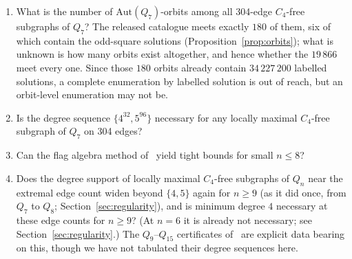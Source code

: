 \documentclass[12pt]{article}
\newcommand{\ex}{\mathrm{ex}}
\begin{document}
\begin{enumerate}
    non-odd-square construction exceed $g(8)=682$? The $Q_7$ audit of
    Section~\ref{sec:oddsquareaudit} shows the two questions are genuinely
    different for $n=7$ (the released $304$-edge solutions are
    overwhelmingly non-odd-square), so no assumption is made
    here about which way $n=8$ resolves. Our current understanding of the
    structural side, stated as such: the parity obstruction of
    Proposition~\ref{prop:q6realizability} operates \emph{inside} the
    odd-square class -- it constrains which field histograms a fully
    frustrated spin configuration can realise -- and says nothing about
    non-odd-square subgraphs; we know of no structural obstruction to a
    non-odd-square $C_4$-free subgraph exceeding $g(n)$. What the data show
    is only this: at $n=6$, where $\ex$ is known, nothing exceeds $g(6)$;
    at $n=7$ every known $304$-edge solution matches $g(7)$ while $98\%$
    of them lie outside the subclass. We read the latter as weak evidence
    that the odd-square constraint is not what pins the known extremal
    count, not as evidence about whether $g(8)$ can be exceeded.
  \item\label{op:orbits} What is the number of $\mathrm{Aut}(Q_7)$-orbits among all 304-edge
    $C_4$-free subgraphs of $Q_7$? The released catalogue meets exactly
    $180$ of them, six of which contain the odd-square solutions
    (Proposition~\ref{prop:orbits}); what is unknown is how many orbits exist
    altogether, and hence whether the $19\,866$ meet every one. Since those
    $180$ orbits already contain $34\,227\,200$ labelled solutions, a
    complete enumeration by labelled solution is out of reach, but an
    orbit-level enumeration may not be.
  \item Is the degree sequence $\{4^{32},5^{96}\}$ necessary for any locally
    maximal $C_4$-free subgraph of $Q_7$ on 304 edges?
  \item Can the flag algebra method of~\cite{Bab12,BHLL12} yield tight bounds
    for small $n\le8$?
  \item Does the degree support of locally maximal $C_4$-free subgraphs
    of $Q_n$ near the extremal edge count widen beyond $\{4,5\}$ again
    for $n\ge9$ (as it did once, from $Q_7$ to $Q_8$; Section~\ref{sec:regularity}),
    and is minimum degree $4$ necessary at these edge counts for
    $n\ge9$? (At $n=6$ it is already not necessary; see
    Section~\ref{sec:regularity}.) The $Q_9$--$Q_{15}$ certificates
    of~\cite{EP86} are explicit data bearing on this, though we have not
    tabulated their degree sequences here.

\end{enumerate}
\end{document}
